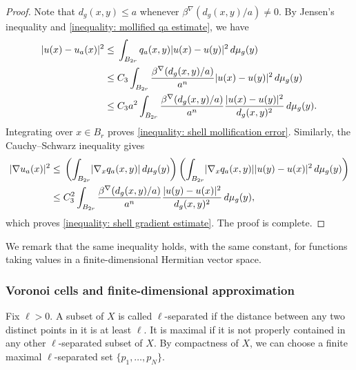 \documentclass[a4paper,oneside,12pt]{amsart}
\theoremstyle{plain}
\theoremstyle{definition}
\theoremstyle{remark}
\DeclarePairedDelimiter{\abs}{\lvert}{\rvert}
\newcommand{\dvol}{d\mu}
\newcommand{\cutoff}{\beta}
\newcommand{\cutoffnabla}{\cutoff^{\nabla}}
\begin{document}
\begin{proof}
  Note that $d_g(x,y)\le a$ whenever $\cutoffnabla(d_g(x,y)/a)\ne 0$.
  By Jensen's inequality and \eqref{inequality: mollified qa estimate}, we have
  \begin{equation}
    \begin{aligned}
      \abs{u(x)-u_a(x)}^2 \le{}& \int_{B_{2r}} q_a(x,y)\abs{u(x)-u(y)}^2 \,\dvol_g(y) \\
      \le{}& C_3 \int_{B_{2r}} \frac{\cutoffnabla(d_g(x,y)/a)}{a^n} \abs{u(x)-u(y)}^2 \,\dvol_g(y) \\
      \le{}&  C_3 a^2 \int_{B_{2r}} \frac{\cutoffnabla(d_g(x,y)/a)}{a^n}
        \frac{\abs{u(x)-u(y)}^2}{d_g(x,y)^2}\,\dvol_g(y).
    \end{aligned}
  \end{equation}
  Integrating over $x \in B_r$ proves \eqref{inequality: shell mollification error}.
  Similarly, the Cauchy--Schwarz inequality gives
  \begin{equation}
    \begin{aligned}
      \abs{\nabla u_a(x)}^2 \le{}& \left(\int_{B_{2r}} \abs{\nabla_x q_a(x,y)} \,\dvol_g(y)\right) \left(\int_{B_{2r}} \abs{\nabla_x q_a(x,y)}\abs{u(y)-u(x)}^2 \,\dvol_g(y)\right) \\
      \le{}& C_3^2 \int_{B_{2r}} \frac{\cutoffnabla(d_g(x,y)/a)}{a^n} \frac{\abs{u(y)-u(x)}^2}{d_g(x,y)^2} \,\dvol_g(y),
    \end{aligned}
  \end{equation}
  which proves \eqref{inequality: shell gradient estimate}.
  The proof is complete.
\end{proof}

We remark that the same inequality holds, with the same constant, for functions taking values in a finite-dimensional Hermitian vector space.

\subsubsection{Voronoi cells and finite-dimensional approximation}

Fix $\ell>0$.
A subset of $X$ is called $\ell$-separated if the distance between any two distinct points in it is at least $\ell$.
It is maximal if it is not properly contained in any other $\ell$-separated subset of $X$.
By compactness of $X$, we can choose a finite maximal $\ell$-separated set $\{p_1,\dots,p_N\}$.
\end{document}
